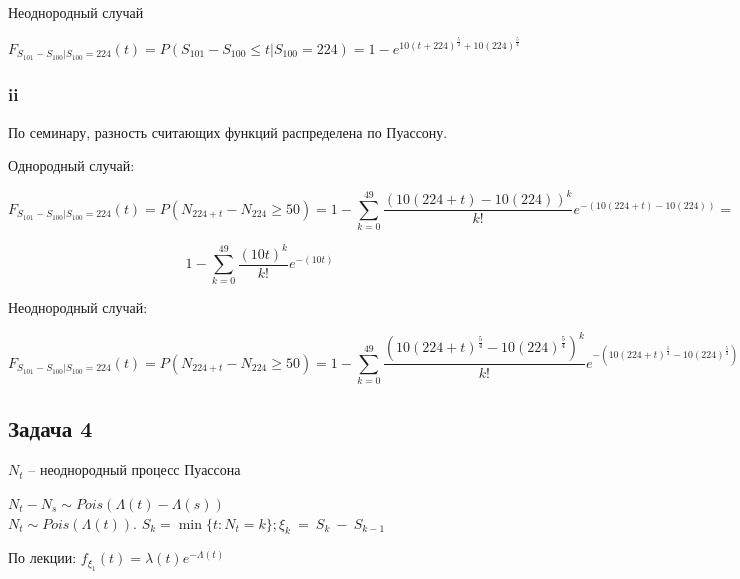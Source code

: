 \documentclass[a4paper,12pt]{article}
\begin{document}
Неоднородный случай

$$ F_{S_{101} - S_{100}|S_{100} = 224}(t) = P(S_{101} - S_{100} \le t|S_{100} = 224) = 1 - e^{10(t + 224)^{\frac{5}{4}} + 10(224)^{\frac{5}{4}}}$$


\subsubsection{ii}
По семинару, разность считающих функций распределена по Пуассону. 

Однородный случай:

$$  F_{S_{101} - S_{100}|S_{100} = 224}(t) = P(N_{224+t} - N_{224} \ge 50) = 1 - \sum_{k=0}^{49} \frac{(10(224+t) - 10(224))^k}{k!} e^{-(10(224+t) - 10(224))} =$$

 $$ 1 - \sum_{k=0}^{49} \frac{(10t)^k}{k!} e^{-(10t)}$$
 
 Неоднородный случай:
 
 $$  F_{S_{101} - S_{100}|S_{100} = 224}(t) = P(N_{224+t} - N_{224} \ge 50) = 1 - \sum_{k=0}^{49} \frac{(10(224+t)^{\frac{5}{4}} - 10(224)^{\frac{5}{4}})^k}{k!} e^{-(10(224+t)^{\frac{5}{4}} - 10(224)^{\frac{5}{4}})} $$


\subsection{Задача 4}

$N_t$ -- неоднородный процесс Пуассона

$ N_t - N_s \sim Pois(\Lambda(t) - \Lambda(s))$\\[-6mm]

$N_t \sim Pois(\Lambda(t))$. $S_k = \min\{t: N_t = k\}; \xi_k~=~S_k~-~S_{k-1}$

По лекции:
$f_{\xi_1}(t) = \lambda(t) e^{-\Lambda(t)}$
\end{document}
